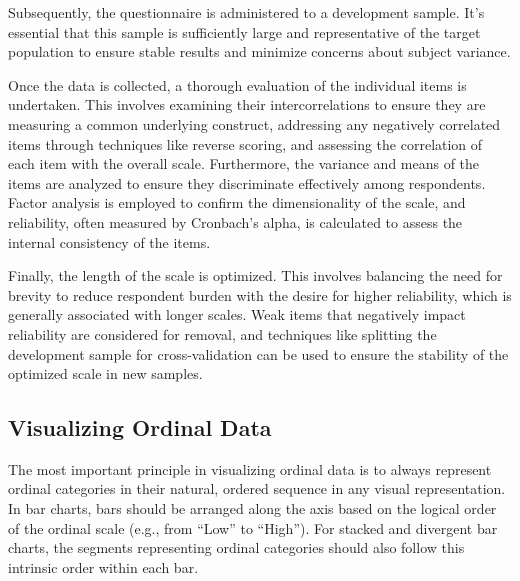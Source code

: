 \documentclass[
  letterpaper,
  DIV=11,
  numbers=noendperiod]{scrartcl}
\begin{document}
Subsequently, the questionnaire is administered to a development sample.
It's essential that this sample is sufficiently large and representative
of the target population to ensure stable results and minimize concerns
about subject variance.

Once the data is collected, a thorough evaluation of the individual
items is undertaken. This involves examining their intercorrelations to
ensure they are measuring a common underlying construct, addressing any
negatively correlated items through techniques like reverse scoring, and
assessing the correlation of each item with the overall scale.
Furthermore, the variance and means of the items are analyzed to ensure
they discriminate effectively among respondents. Factor analysis is
employed to confirm the dimensionality of the scale, and reliability,
often measured by Cronbach's alpha, is calculated to assess the internal
consistency of the items.

Finally, the length of the scale is optimized. This involves balancing
the need for brevity to reduce respondent burden with the desire for
higher reliability, which is generally associated with longer scales.
Weak items that negatively impact reliability are considered for
removal, and techniques like splitting the development sample for
cross-validation can be used to ensure the stability of the optimized
scale in new samples.

\hypertarget{visualizing-ordinal-data}{%
\subsection{Visualizing Ordinal Data}\label{visualizing-ordinal-data}}

The most important principle in visualizing ordinal data is to always
represent ordinal categories in their natural, ordered sequence in any
visual representation. In bar charts, bars should be arranged along the
axis based on the logical order of the ordinal scale (e.g., from ``Low''
to ``High''). For stacked and divergent bar charts, the segments
representing ordinal categories should also follow this intrinsic order
within each bar.
\end{document}
